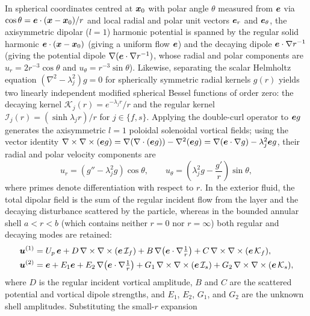 In spherical coordinates centred at $\bm{x}_0$ with polar angle $\theta$ measured from $\bm{e}$ via
$\cos\theta=\bm{e}\cdot(\bm{x}-\bm{x}_0)/r$ and local radial and polar unit vectors $\bm{e}_r$ and $\bm{e}_\theta$, the axisymmetric
dipolar ($l=1$) harmonic potential is spanned by the regular solid harmonic $\bm{e}\cdot(\bm{x}-\bm{x}_0)$ (giving a uniform flow
$\bm{e}$) and the decaying dipole $\bm{e}\cdot\nabla r^{-1}$ (giving the potential dipole $\nabla(\bm{e}\cdot\nabla r^{-1})$,
whose radial and polar components are $u_r=2r^{-3}\cos\theta$ and $u_\theta=r^{-3}\sin\theta$). Likewise, separating the
scalar Helmholtz equation $(\nabla^2-\lambda_j^2)g=0$ for spherically symmetric radial kernels $g(r)$ yields two
linearly independent modified spherical Bessel functions of order zero: the decaying kernel $\mathcal K_j(r)=e^{-\lambda_jr}/r$
and the regular kernel $\mathcal I_j(r)=(\sinh\lambda_jr)/r$ for $j\in\{f,s\}$. Applying the double-curl operator to
$\bm{e} g$ generates the axisymmetric $l=1$ poloidal solenoidal vortical fields; using the vector identity
$\nabla\times\nabla\times(\bm{e} g)=\nabla(\nabla\cdot(\bm{e} g))-\nabla^2(\bm{e} g)=\nabla(\bm{e}\cdot\nabla g)-\lambda_j^2\bm{e} g$, their radial and
polar velocity components are
\begin{equation}
  u_r=\left(g''-\lambda_j^2g\right)\cos\theta,\qquad u_\theta=\left(\lambda_j^2g-\frac{g'}{r}\right)\sin\theta,
  \label{eq:vort_radial}
\end{equation}
where primes denote differentiation with respect to $r$. In the exterior fluid, the total dipolar field is the sum of the
regular incident flow from the layer and the decaying disturbance scattered by the particle, whereas in the bounded
annular shell $a<r<b$ (which contains neither $r=0$ nor $r=\infty$) both regular and decaying modes are retained:
\begin{subequations}\label{eq:fields}
\begin{align}
  \bm{u}^{(1)}&=U_p\,\bm{e}+D\,\nabla\times\nabla\times(\bm{e}\,\mathcal I_f)
  +B\,\nabla\!\left(\bm{e}\cdot\nabla\tfrac1r\right)+C\,\nabla\times\nabla\times(\bm{e}\,\mathcal K_f),
  \label{eq:field_ext}\\
  \bm{u}^{(2)}&=\bm{e}+E_1\bm{e}+E_2\,\nabla\!\left(\bm{e}\cdot\nabla\tfrac1r\right)
  +G_1\,\nabla\times\nabla\times(\bm{e}\,\mathcal I_s)+G_2\,\nabla\times\nabla\times(\bm{e}\,\mathcal K_s),
  \label{eq:field_shell}
\end{align}
\end{subequations}
where $D$ is the regular incident vortical amplitude, $B$ and $C$ are the scattered potential and vortical dipole
strengths, and $E_1$, $E_2$, $G_1$, and $G_2$ are the unknown shell amplitudes. Substituting the small-$r$ expansion
